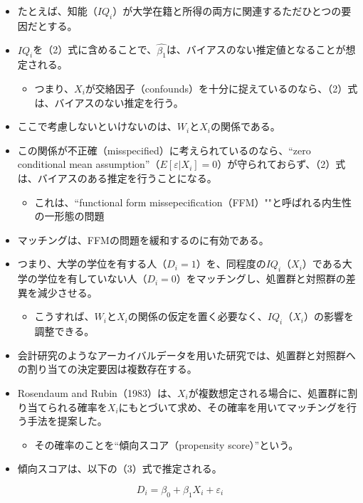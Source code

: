 \begin{itemize}
 \item たとえば、知能（$IQ_i$）が大学在籍と所得の両方に関連するただひとつの要因だとする。
 \item $IQ_i$を（2）式に含めることで、$\hat{\beta_1}$は、バイアスのない推定値となることが想定される。
  \begin{itemize}
   \item つまり、$X_i$が交絡因子（confounds）を十分に捉えているのなら、（2）式は、バイアスのない推定を行う。
  \end{itemize}
 \item ここで考慮しないといけないのは、$W_i$と$X_i$の関係である。
 \item この関係が不正確（misspecified）に考えられているのなら、“zero conditional mean assumption”（$E[\varepsilon | X_i] = 0$）が守られておらず、（2）式は、バイアスのある推定を行うことになる。
  \begin{itemize}
   \item これは、``functional form missepecification（FFM）""と呼ばれる内生性の一形態の問題
  \end{itemize}
\item マッチングは、FFMの問題を緩和するのに有効である。
 \item つまり、大学の学位を有する人（$D_i=1$）を、同程度の$IQ_i$（$X_i$）である大学の学位を有していない人（$D_i=0$）をマッチングし、処置群と対照群の差異を減少させる。
  \begin{itemize}
   \item こうすれば、$W_i$と$X_i$の関係の仮定を置く必要なく、$IQ_i$（$X_i$）の影響を調整できる。
  \end{itemize}
 \item 会計研究のようなアーカイバルデータを用いた研究では、処置群と対照群への割り当ての決定要因は複数存在する。
 \item Rosendaum and Rubin（1983）は、$X_i$が複数想定される場合に、処置群に割り当てられる確率を$X_i$にもとづいて求め、その確率を用いてマッチングを行う手法を提案した。
  \begin{itemize}
   \item その確率のことを``傾向スコア（propensity score）''という。
  \end{itemize}
\item 傾向スコアは、以下の（3）式で推定される。
\end{itemize}

\begin{equation}
D_i = \beta_0 + \beta_1 X_i + \varepsilon_i
\end{equation}

